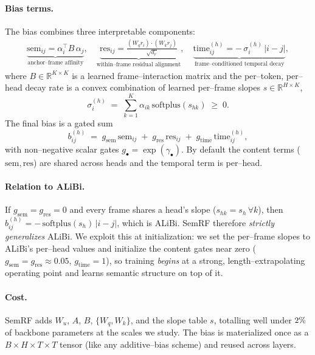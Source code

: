 \documentclass[11pt]{article}
\begin{document}
\paragraph{Bias terms.} The bias combines three interpretable components:
\begin{align}
  \underbrace{\mathrm{sem}_{ij} = \alpha_i^\top B\, \alpha_j}_{\text{anchor--frame affinity}}, \quad
  \underbrace{\mathrm{res}_{ij} = \frac{(W_q r_i)\cdot(W_k r_j)}{\sqrt{d_r}}}_{\text{within--frame residual alignment}}, \quad
  \underbrace{\mathrm{time}^{(h)}_{ij} = -\,\sigma^{(h)}_i\,|i-j|}_{\text{frame--conditioned temporal decay}},
\end{align}
where $B \in \mathbb{R}^{K\times K}$ is a learned frame--interaction matrix and
the per--token, per--head decay rate is a convex combination of learned
per--frame slopes $s \in \mathbb{R}^{H \times K}$,
\begin{equation}
  \sigma^{(h)}_i \;=\; \sum_{k=1}^{K} \alpha_{ik}\,\mathrm{softplus}(s_{hk}) \;\ge\; 0 .
\end{equation}
The final bias is a gated sum
\begin{equation}
  b^{(h)}_{ij} \;=\; g_{\mathrm{sem}}\,\mathrm{sem}_{ij}
  \;+\; g_{\mathrm{res}}\,\mathrm{res}_{ij}
  \;+\; g_{\mathrm{time}}\,\mathrm{time}^{(h)}_{ij},
\end{equation}
with non--negative scalar gates $g_\bullet = \exp(\gamma_\bullet)$. By default the
content terms ($\mathrm{sem}, \mathrm{res}$) are shared across heads and the
temporal term is per--head.

\paragraph{Relation to ALiBi.} If $g_{\mathrm{sem}}=g_{\mathrm{res}}=0$ and every
frame shares a head's slope ($s_{hk}=s_h\,\forall k$), then
$b^{(h)}_{ij} = -\,\mathrm{softplus}(s_h)\,|i-j|$, which is ALiBi. SemRF therefore
\emph{strictly generalizes} ALiBi. We exploit this at initialization: we set the
per--frame slopes to ALiBi's per--head values and initialize the content gates
near zero ($g_{\mathrm{sem}}\!=\!g_{\mathrm{res}}\!\approx\!0.05$,
$g_{\mathrm{time}}\!=\!1$), so training \emph{begins} at a strong,
length--extrapolating operating point and learns semantic structure on top of it.

\paragraph{Cost.} SemRF adds $W_u$, $A$, $B$, $\{W_q,W_k\}$, and the slope table
$s$, totalling well under $2\%{}$ of backbone parameters at the
scales we study. The bias is materialized once as a $B\!\times\!H\!\times\!T\!\times\!T$
tensor (like any additive--bias scheme) and reused across layers.
\end{document}
